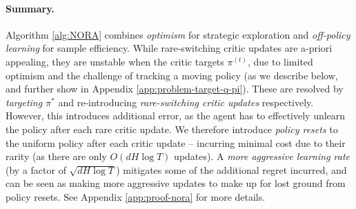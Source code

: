 \paragraph{Summary. } Algorithm \ref{alg:NORA} combines \emph{optimism} for strategic exploration and \emph{off-policy learning} for sample efficiency. While rare-switching critic updates are a-priori appealing, they are unstable when the critic targets $\pi^{(t)}$, due to limited optimism and the challenge of tracking a moving policy (as we describe below, and further show in Appendix \ref{app:problem-target-q-pi}). These are resolved by \emph{targeting $\pi^*$} and re-introducing \emph{rare-switching critic updates} respectively. However, this introduces additional error, as the agent has to effectively unlearn the policy after each rare critic update. We therefore introduce \emph{policy resets} to the uniform policy after each critic update -- incurring minimal cost due to their rarity (as there are only $O(dH\log T)$ updates). A \emph{more aggressive learning rate} (by a factor of $\sqrt{dH\log T}$) mitigates some of the additional regret incurred, and can be seen as making more aggressive updates to make up for lost ground from policy resets. See Appendix \ref{app:proof-nora} for more details.

